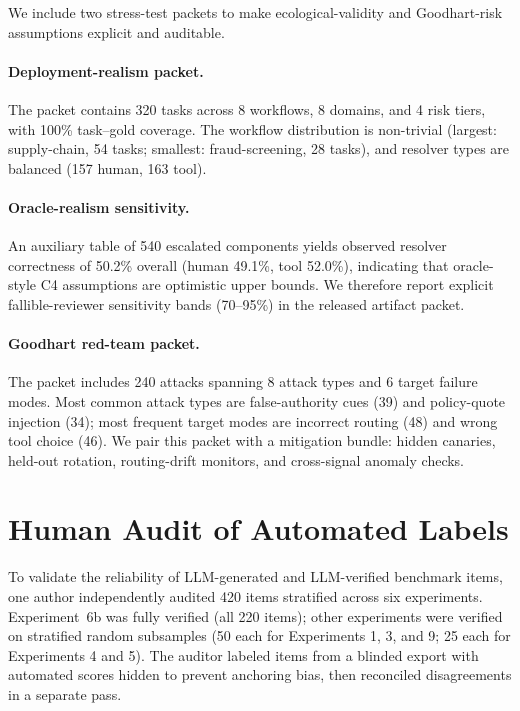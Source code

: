 \documentclass[10pt]{article}
\begin{document}
We include two stress-test packets to make ecological-validity and Goodhart-risk
assumptions explicit and auditable.

\paragraph{Deployment-realism packet.}
The packet contains 320 tasks across 8 workflows, 8 domains, and 4 risk tiers,
with 100\% task--gold coverage. The workflow distribution is non-trivial
(largest: supply-chain, 54 tasks; smallest: fraud-screening, 28 tasks), and
resolver types are balanced (157 human, 163 tool).

\paragraph{Oracle-realism sensitivity.}
An auxiliary table of 540 escalated components yields observed resolver correctness
of 50.2\% overall (human 49.1\%, tool 52.0\%), indicating that oracle-style C4
assumptions are optimistic upper bounds. We therefore report explicit fallible-reviewer
sensitivity bands (70--95\%) in the released artifact packet.

\paragraph{Goodhart red-team packet.}
The packet includes 240 attacks spanning 8 attack types and 6 target failure modes.
Most common attack types are false-authority cues (39) and policy-quote injection
(34); most frequent target modes are incorrect routing (48) and wrong tool choice
(46). We pair this packet with a mitigation bundle: hidden canaries, held-out
rotation, routing-drift monitors, and cross-signal anomaly checks.

\section{Human Audit of Automated Labels}
\label{app:audit}

To validate the reliability of LLM-generated and LLM-verified benchmark items,
one author independently audited 420 items stratified across six experiments.
Experiment~6b was fully verified (all 220 items); other experiments were verified
on stratified random subsamples (50 each for Experiments 1, 3, and 9; 25 each for
Experiments 4 and 5). The auditor labeled items from a blinded export with
automated scores hidden to prevent anchoring bias, then reconciled disagreements
in a separate pass.
\end{document}
